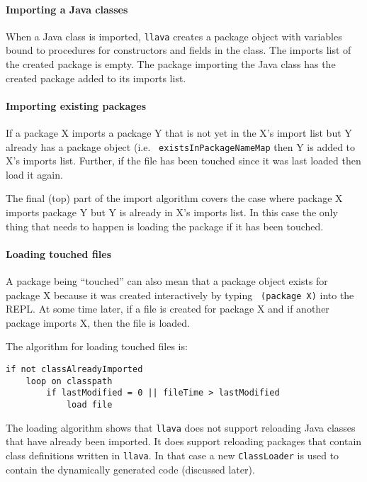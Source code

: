 \documentclass{acm-final/sig-alternate-modified}
\begin{document}
\paragraph{Importing a Java classes}

When a Java class is imported, {\tt llava} creates a package object
with variables bound to procedures for constructors and fields in the
class.  The imports list of the created package is empty.  The package
importing the Java class has the created package added to its imports
list.

\paragraph{Importing existing packages}

If a package X imports a package Y that is not yet in
the X's import list but Y already has a package object (i.e. {\tt
existsInPackageNameMap} then Y is added to X's imports list.  Further,
if the file has been touched since it was last loaded then load it
again.

The final (top) part of the import algorithm covers the case where package X
imports package Y but Y is already in X's imports list.  In this case
the only thing that needs to happen is loading the package if it has
been touched.

\paragraph{Loading touched files}

A package being ``touched'' can also mean that a package object exists
for package X because it was created interactively by typing {\tt
(package X)} into the REPL.  At some time later, if a file is created
for package X and if another package imports X, then the file is
loaded.

The algorithm for loading touched files is:

\small
\begin{verbatim}
if not classAlreadyImported
    loop on classpath
        if lastModified = 0 || fileTime > lastModified
            load file
\end{verbatim}
\normalsize

The loading algorithm shows that {\tt llava} does not support
reloading Java classes that have already been imported.  It does
support reloading packages that contain class definitions written in
{\tt llava}.  In that case a new {\tt ClassLoader} is used to contain
the dynamically generated code (discussed later).
\end{document}
